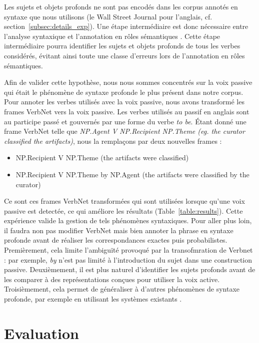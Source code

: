 Les sujets et objets profonds ne sont pas encodés dans les corpus annotés en
syntaxe que nous utilisons (le Wall Street Journal pour l'anglais, cf.
section~\ref{subsec:details_exp}). Une étape intermédiaire est donc nécessaire
entre l'analyse syntaxique et l'annotation en rôles sémantiques
\citep{bonfante2011modular, ribeyre2013systeme}. Cette étape intermédiaire
pourra identifier les sujets et objets profonds de tous les verbes considérés,
évitant ainsi toute une classe d'erreurs lors de l'annotation en rôles
sémantiques. 

Afin de valider cette hypothèse, nous nous sommes concentrés sur la voix
passive qui était le phénomène de syntaxe profonde le plus présent dans notre
corpus.  Pour annoter les verbes utilisés avec la voix passive, nous avons
transformé les frames VerbNet vers la voix passive. Les verbes utilisés au
passif en anglais sont au participe passé et gouvernés par une forme du verbe
\emph{to be}. Étant donné une frame VerbNet telle que \emph{NP.Agent V
NP.Recipient NP.Theme (eg. the curator classified the artifacts)}, nous la
remplaçons par deux nouvelles frames :

\begin{itemize}
    \item NP.Recipient V NP.Theme (the artifacts were classified)
    \item NP.Recipient V NP.Theme by NP.Agent (the artifacts were classified by the curator)
\end{itemize}

Ce sont ces frames VerbNet transformées qui sont utilisées lorsque qu'une voix
passive est detectée, ce qui améliore les résultats
(Table~\ref{table:results}). Cette expérience valide la gestion de tels
phénomènes syntaxiques. Pour aller plus loin, il faudra non pas modifier
VerbNet mais bien annoter la phrase en syntaxe profonde avant de réaliser les
correspondances exactes puis probabilistes. Premièrement, cela limite
l'ambiguïté provoqué par la transofmration de Verbnet : par exemple,
\textit{by} n'est pas limité à l'introduction du sujet dans une construction
passive. Deuxièmement, il est plus naturel d'identifier les sujets profonds
avant de les comparer à des représentations conçues pour utiliser la voix
active. Troisièmement, cela permet de généraliser à d'autres phénomènes de
syntaxe profonde, par exemple en utilisant les systèmes existants
\citep{bonfante2011modular,ribeyre2013systeme}.

\section{Evaluation}
\label{srl:evaluation}


